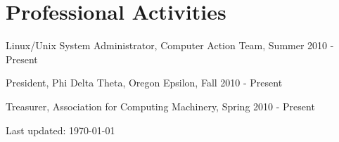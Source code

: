 \documentclass[10pt,letterpaper]{article}
\renewenvironment{itemize}{
  \begin{list}{}{
    \setlength{\leftmargin}{1.5em}
    \setlength{\itemsep}{0em}
    \setlength{\parskip}{0pt}
    \setlength{\parsep}{0em}
  }
}{
  \end{list}
}
\begin{document}
\section*{Professional Activities}

\begin{itemize}

\item Linux/Unix System Administrator, Computer Action Team, Summer 2010 - Present
\item President, Phi Delta Theta, Oregon Epsilon, Fall 2010 - Present
\item Treasurer, Association for Computing Machinery, Spring 2010 - Present

\end{itemize}

\bigskip

\begin{center}
  \begin{small}
    Last updated: \today
  \end{small}
\end{center}
\end{document}
